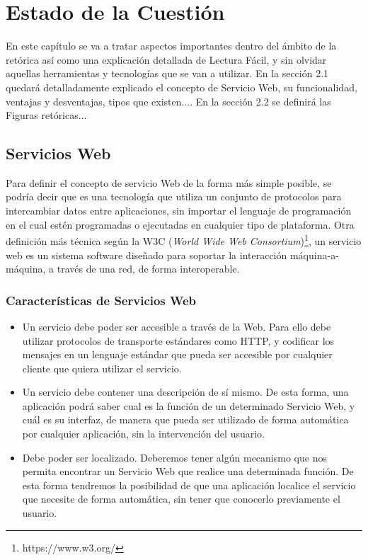 \chapter{Estado de la Cuestión}
\label{cap:estadoDeLaCuestion}
En este capítulo se va a tratar aspectos importantes dentro del ámbito de la retórica así como una explicación detallada de Lectura Fácil, y sin olvidar aquellas herramientas y tecnologías que se van a utilizar.
En la sección 2.1 quedará detalladamente explicado el concepto de Servicio Web, su funcionalidad, ventajas y desventajas, tipos que existen....
En la sección 2.2 se definirá las Figuras retóricas...



\section{Servicios Web}
\label{cap:sec:servicios_web}

Para definir el concepto de servicio Web de la forma más simple posible, se podría decir que es una tecnología que utiliza un conjunto de protocolos para intercambiar datos entre aplicaciones, sin importar el lenguaje de programación en el cual estén programadas o ejecutadas en cualquier tipo de plataforma. Otra definición más técnica según la W3C (\textit{World Wide Web Consortium})\footnote{https://www.w3.org/},  un servicio web es un sistema software diseñado para soportar la interacción máquina-a-máquina, a través de una red, de forma interoperable. 

\subsection{Características de  Servicios Web}
\label{cap:subsec:caracteristicasserviciosweb}

\begin{itemize}
\item Un servicio debe poder ser accesible a través de la Web. Para ello debe utilizar protocolos de transporte estándares como HTTP, y codificar los mensajes en un lenguaje estándar que pueda ser accesible por cualquier cliente que quiera utilizar el servicio. 

\item Un servicio debe contener una descripción de sí mismo. De esta forma, una aplicación podrá saber cual es la función de un determinado Servicio Web, y cuál es su interfaz, de manera que pueda ser utilizado de forma automática por cualquier aplicación, sin la intervención del usuario.
\item Debe poder ser localizado. Deberemos tener algún mecanismo que nos permita encontrar un Servicio Web que realice una determinada función. De esta forma tendremos la posibilidad de que una aplicación localice el servicio que necesite de forma automática, sin tener que conocerlo previamente el usuario.
\end{itemize}


